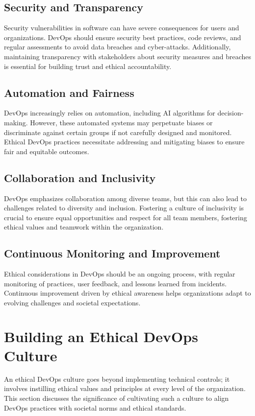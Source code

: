 \documentclass[conference]{IEEEtran}
\begin{document}
\subsection{Security and Transparency}
Security vulnerabilities in software can have severe consequences for users and organizations. DevOps should ensure security best practices, code reviews, and regular assessments to avoid data breaches and cyber-attacks. Additionally, maintaining transparency with stakeholders about security measures and breaches is essential for building trust and ethical accountability.

\subsection{Automation and Fairness}
DevOps increasingly relies on automation, including AI algorithms for decision-making. However, these automated systems may perpetuate biases or discriminate against certain groups if not carefully designed and monitored. Ethical DevOps practices necessitate addressing and mitigating biases to ensure fair and equitable outcomes.


\subsection{Collaboration and Inclusivity}
DevOps emphasizes collaboration among diverse teams, but this can also lead to challenges related to diversity and inclusion. Fostering a culture of inclusivity is crucial to ensure equal opportunities and respect for all team members, fostering ethical values and teamwork within the organization.

\subsection{Continuous Monitoring and Improvement}
Ethical considerations in DevOps should be an ongoing process, with regular monitoring of practices, user feedback, and lessons learned from incidents. Continuous improvement driven by ethical awareness helps organizations adapt to evolving challenges and societal expectations.


\section{Building an Ethical DevOps Culture}

An ethical DevOps culture goes beyond implementing technical controls; it involves instilling ethical values and principles at every level of the organization. This section discusses the significance of cultivating such a culture to align DevOps practices with societal norms and ethical standards.
\end{document}
